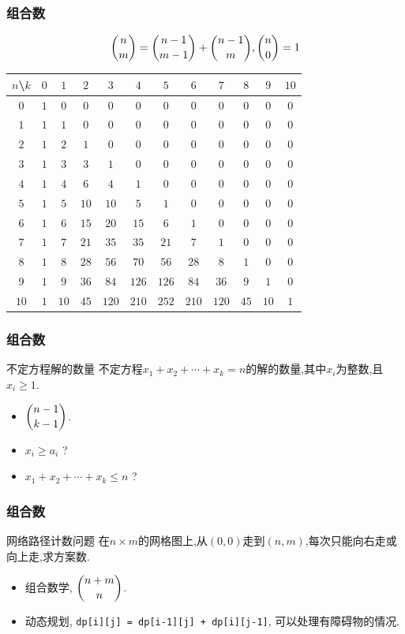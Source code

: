\documentclass[aspectratio=169]{beamer}  %
\newcommand{\pau}{\pause}
\begin{document}
\begin{frame}[fragile]
    \frametitle{组合数}
    $$\dbinom{n}{m}=\dbinom{n-1}{m-1}+\dbinom{n-1}{m},\dbinom{n}{0}=1$$
	\begin{center}
		\footnotesize
		\begin{tabular}{c|ccccccccccc}
			$n$\textbackslash$k$&$0$&$1$&$2$&$3$&$4$&$5$&$6$&$7$&$8$&$9$&$10$\\\hline
			$0$&$1$&$0$&$0$&$0$&$0$&$0$&$0$&$0$&$0$&$0$&$0$\\
			$1$&$1$&$1$&$0$&$0$&$0$&$0$&$0$&$0$&$0$&$0$&$0$\\
			$2$&$1$&$2$&$1$&$0$&$0$&$0$&$0$&$0$&$0$&$0$&$0$\\
			$3$&$1$&$3$&$3$&$1$&$0$&$0$&$0$&$0$&$0$&$0$&$0$\\
			$4$&$1$&$4$&$6$&$4$&$1$&$0$&$0$&$0$&$0$&$0$&$0$\\
			$5$&$1$&$5$&$10$&$10$&$5$&$1$&$0$&$0$&$0$&$0$&$0$\\
			$6$&$1$&$6$&$15$&$20$&$15$&$6$&$1$&$0$&$0$&$0$&$0$\\
			$7$&$1$&$7$&$21$&$35$&$35$&$21$&$7$&$1$&$0$&$0$&$0$\\
			$8$&$1$&$8$&$28$&$56$&$70$&$56$&$28$&$8$&$1$&$0$&$0$\\
			$9$&$1$&$9$&$36$&$84$&$126$&$126$&$84$&$36$&$9$&$1$&$0$\\
			$10$&$1$&$10$&$45$&$120$&$210$&$252$&$210$&$120$&$45$&$10$&$1$\\
		\end{tabular}
	\end{center}
\end{frame}

\begin{frame}[fragile]
    \frametitle{组合数}
    \begin{exampleblock}{不定方程解的数量}
        不定方程$x_1+x_2+\cdots+x_k=n$的解的数量,其中$x_i$为整数,且$x_i\geqslant1$.
    \end{exampleblock}\pau
    \begin{itemize}
        \item $\dbinom{n-1}{k-1}$. \pau
        \item $x_i\geqslant a_i$ ? \pau
        \item $x_1+x_2+\cdots+x_k\le n$ ? 
    \end{itemize}
\end{frame}

\begin{frame}[fragile]
    \frametitle{组合数}
    \begin{exampleblock}{网络路径计数问题}
        在$n\times m$的网格图上,从$(0,0)$走到$(n,m)$,每次只能向右走或向上走,求方案数.
    \end{exampleblock}\pau
    \begin{itemize}
        \item 组合数学, $\dbinom{n+m}{n}$. \pau
        \item 动态规划, \texttt{dp[i][j] = dp[i-1][j] + dp[i][j-1]}, 可以处理有障碍物的情况.
    \end{itemize}
\end{frame}
\end{document}
